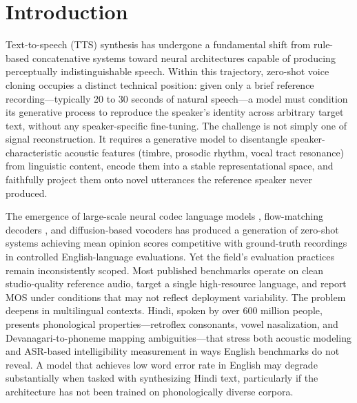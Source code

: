 \section{Introduction}

Text-to-speech (TTS) synthesis has undergone a fundamental shift from rule-based concatenative systems toward neural architectures
capable of producing perceptually indistinguishable speech. Within this trajectory, zero-shot voice cloning occupies a distinct
technical position: given only a brief reference recording---typically 20 to 30 seconds of natural speech---a model must condition
its generative process to reproduce the speaker's identity across arbitrary target text, without any speaker-specific fine-tuning.
The challenge is not simply one of signal reconstruction. It requires a generative model to disentangle speaker-characteristic
acoustic features (timbre, prosodic rhythm, vocal tract resonance) from linguistic content, encode them into a stable
representational space, and faithfully project them onto novel utterances the reference speaker never produced.

The emergence of large-scale neural codec language models \cite{wang2023neural, borsos2023audiolm}, flow-matching decoders
\cite{le2024voicebox}, and diffusion-based vocoders has produced a generation of zero-shot systems achieving mean opinion scores
competitive with ground-truth recordings in controlled English-language evaluations. Yet the field's evaluation practices remain
inconsistently scoped. Most published benchmarks operate on clean studio-quality reference audio, target a single high-resource
language, and report MOS under conditions that may not reflect deployment variability. The problem deepens in multilingual contexts.
Hindi, spoken by over 600 million people, presents phonological properties---retroflex consonants, vowel nasalization, and
Devanagari-to-phoneme mapping ambiguities---that stress both acoustic modeling and ASR-based intelligibility measurement in ways
English benchmarks do not reveal. A model that achieves low word error rate in English may degrade substantially when tasked with
synthesizing Hindi text, particularly if the architecture has not been trained on phonologically diverse corpora.


